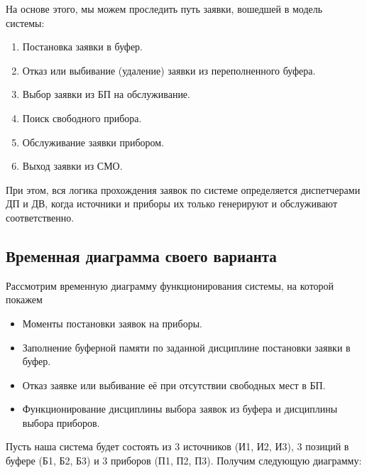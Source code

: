 \documentclass{article}
\begin{document}
На основе этого, мы можем проследить путь заявки, вошедшей в модель системы:
\begin{enumerate}
	\item Постановка заявки в буфер.
	\item Отказ или выбивание (удаление) заявки из переполненного буфера.
	\item Выбор заявки из БП на обслуживание.
	\item Поиск свободного прибора.
	\item Обслуживание заявки прибором.
	\item Выход заявки из СМО.
\end{enumerate}
При этом, вся логика прохождения заявок по системе определяется диспетчерами ДП и ДВ, когда источники и приборы их только генерируют и обслуживают соответственно.


\subsection{Временная диаграмма своего варианта}
Рассмотрим временную диаграмму функционирования системы, на которой покажем
\begin{itemize}
	\item Моменты постановки заявок на приборы.
	\item Заполнение буферной памяти по заданной дисциплине постановки заявки в буфер.
	\item Отказ заявке или выбивание её при отсутствии свободных мест в БП.
	\item Функционирование дисциплины выбора заявок из буфера и дисциплины выбора приборов.
\end{itemize}
Пусть наша система будет состоять из 3 источников (И1, И2, И3), 3 позиций в буфере (Б1, Б2, Б3) и 3 приборов (П1, П2, П3). Получим следующую диаграмму:
\end{document}

